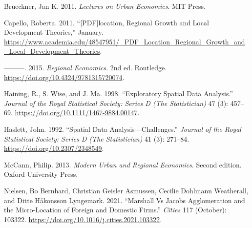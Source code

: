 \documentclass[
  10,
  a4paper,
]{article}
\newlength{\cslhangindent}
\newlength{\cslentryspacingunit} %
\newenvironment{CSLReferences}[2] %
 {%
  \setlength{\parindent}{0pt}
  \ifodd #1
  \let\oldpar\par
  \def\par{\hangindent=\cslhangindent\oldpar}
  \fi
  \setlength{\parskip}{#2\cslentryspacingunit}
 }%
 {}
\begin{document}
\hypertarget{refs}{}
\begin{CSLReferences}{1}{0}
\leavevmode{}%
Brueckner, Jan K. 2011. \emph{Lectures on Urban Economics}. MIT Press.

\leavevmode{}%
Capello, Roberta. 2011. {``{[}PDF{]}location, Regional Growth and Local
Development Theories,''} January.
\url{https://www.academia.edu/48547951/_PDF_Location_Regional_Growth_and_Local_Development_Theories}.

\leavevmode{}%
---------. 2015. \emph{Regional Economics}. 2nd ed. Routledge.
\url{https://doi.org/10.4324/9781315720074}.

\leavevmode{}%
Haining, R., S. Wise, and J. Ma. 1998. {``Exploratory Spatial Data
Analysis.''} \emph{Journal of the Royal Statistical Society: Series D
(The Statistician)} 47 (3): 457--69.
\url{https://doi.org/10.1111/1467-9884.00147}.

\leavevmode{}%
Haslett, John. 1992. {``Spatial Data Analysis---Challenges.''}
\emph{Journal of the Royal Statistical Society: Series D (The
Statistician)} 41 (3): 271--84. \url{https://doi.org/10.2307/2348549}.

\leavevmode{}%
McCann, Philip. 2013. \emph{Modern Urban and Regional Economics}. Second
edition. Oxford University Press.

\leavevmode{}%
Nielsen, Bo Bernhard, Christian Geisler Asmussen, Cecilie Dohlmann
Weatherall, and Ditte Håkonsson Lyngemark. 2021. {``Marshall Vs Jacobs
Agglomeration and the Micro-Location of Foreign and Domestic Firms.''}
\emph{Cities} 117 (October): 103322.
\url{https://doi.org/10.1016/j.cities.2021.103322}.

\end{CSLReferences}
\end{document}
